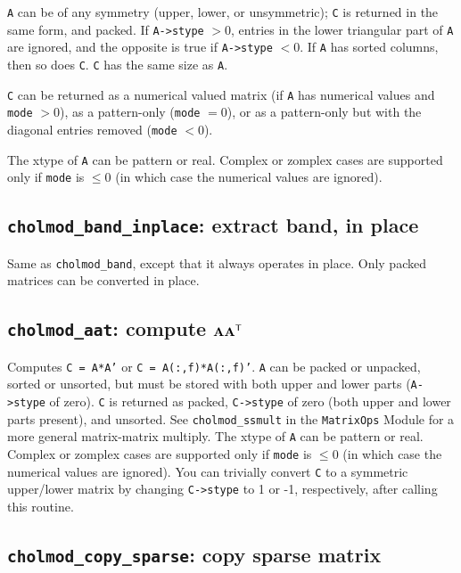 \documentclass[11pt]{article}
\newcommand{\m}[1]{{\bf{#1}}}       %
\newcommand{\tr}{^{\sf T}}          %
\begin{document}
{\tt A} can be of any symmetry (upper, lower, or unsymmetric); {\tt C} is returned in
the same form, and packed.  If {\tt A->stype} $> 0$, entries in the lower
triangular part of {\tt A} are ignored, and the opposite is true if
{\tt A->stype} $< 0$.  If {\tt A} has sorted columns, then so does {\tt C}.
{\tt C} has the same size as {\tt A}.

{\tt C} can be returned as a numerical valued matrix (if {\tt A} has numerical values
and {\tt mode} $> 0$), as a pattern-only ({\tt mode} $=0$), or as a pattern-only but with
the diagonal entries removed ({\tt mode} $< 0$).

The xtype of {\tt A} can be pattern or real.  Complex or zomplex cases are supported only
if {\tt mode} is $\le 0$ (in which case the numerical values are ignored).

\subsection{{\tt cholmod\_band\_inplace}: extract band, in place}


Same as {\tt cholmod\_band}, except that it always operates in place.
Only packed matrices can be converted in place.

\subsection{{\tt cholmod\_aat}: compute $\m{AA}\tr$}


Computes {\tt C = A*A'} or {\tt C = A(:,f)*A(:,f)'}.
{\tt A} can be packed or unpacked, sorted or unsorted, but must be stored with
both upper and lower parts ({\tt A->stype} of zero).  {\tt C} is returned as packed,
{\tt C->stype} of zero (both upper and lower parts present), and unsorted.  See
{\tt cholmod\_ssmult} in the {\tt MatrixOps} Module for a more general matrix-matrix
multiply.
The xtype of {\tt A} can be pattern or real.  Complex or zomplex cases are supported only
if {\tt mode} is $\le 0$ (in which case the numerical values are ignored).
You can trivially convert {\tt C} to a symmetric upper/lower matrix
by changing {\tt C->stype} to 1 or -1, respectively, after calling this routine.

\subsection{{\tt cholmod\_copy\_sparse}: copy sparse matrix}
\end{document}
